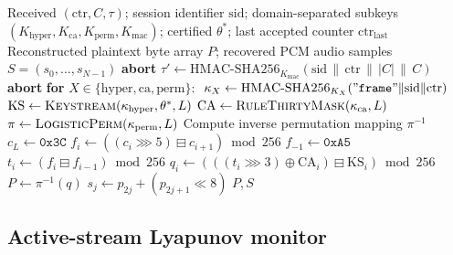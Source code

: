 \documentclass[pdflatex,sn-mathphys-num]{sn-jnl}%
\theoremstyle{thmstyleone}%
\theoremstyle{thmstyletwo}%
\theoremstyle{thmstylethree}%
\begin{document}
\begin{algorithm}[!ht]
\caption{Audio frame decryption and signal reconstruction (Inverse Layers 5--2)}
\label{alg:dec}
\begin{algorithmic}[1]
\Require Received $(\mathrm{ctr}, C, \tau)$; session identifier $\mathrm{sid}$; domain-separated subkeys $(K_{\mathrm{hyper}}, K_{\mathrm{ca}}, K_{\mathrm{perm}}, K_{\mathrm{mac}})$; certified $\theta^\ast$; last accepted counter $\mathrm{ctr}_{\mathrm{last}}$
\Ensure Reconstructed plaintext byte array $P$; recovered PCM audio samples $S = (s_0,\dots,s_{N-1})$
 \State \textbf{abort}  \EndIf
\State $\tau' \gets \mathrm{HMAC\text{-}SHA256}_{K_{\mathrm{mac}}}(\mathrm{sid}\,\|\,\mathrm{ctr}\,\|\,|C|\,\|\,C)$ 
    \State \textbf{abort} 
\EndIf
\State \textbf{for} $X\in\{\mathrm{hyper},\mathrm{ca},\mathrm{perm}\}$: $\ \kappa_X \gets \mathrm{HMAC\text{-}SHA256}_{K_X}(\mathtt{"frame"}\|\mathrm{sid}\|\mathrm{ctr})$
\State $\mathrm{KS} \gets \textsc{Keystream}(\kappa_{\mathrm{hyper}},\theta^\ast,L)$ 
\State $\mathrm{CA} \gets \textsc{RuleThirtyMask}(\kappa_{\mathrm{ca}},L)$ 
\State $\pi \gets \textsc{LogisticPerm}(\kappa_{\mathrm{perm}},L)$ 
\State Compute inverse permutation mapping $\pi^{-1}$
\State $c_L \gets \texttt{0x3C}$
 
    \State $f_i \gets ((c_i \ggg 5) \boxminus c_{i+1}) \bmod 256$
\EndFor
\State $f_{-1} \gets \texttt{0xA5}$
 
    \State $t_i \gets (f_i \boxminus f_{i-1}) \bmod 256$
    \State $q_i \gets (((t_i \ggg 3) \oplus \mathrm{CA}_i) \boxminus \mathrm{KS}_i) \bmod 256$
\EndFor
\State $P \gets \pi^{-1}(q)$ 
 
    \State $s_j \gets p_{2j} + (p_{2j+1} \ll 8)$
\EndFor
\State \Return $P, S$
\end{algorithmic}
\end{algorithm}

\subsection{Active-stream Lyapunov monitor}
\label{sec:asl}
\end{document}
